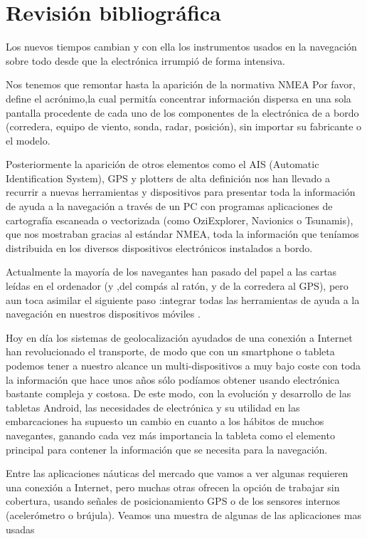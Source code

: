 \chapter{Revisión bibliográfica}
\label{revision}

Los nuevos tiempos cambian y con ella los instrumentos usados en la
navegación sobre todo desde que la electrónica irrumpió de forma
intensiva.

Nos tenemos que remontar hasta la aparición de la normativa NMEA
{\color{red} Por favor, define el acrónimo},la cual permitía
concentrar información dispersa en una sola pantalla procedente de
cada uno de los componentes de la electrónica de a bordo (corredera,
equipo de viento, sonda, radar, posición), sin importar su fabricante
o el modelo.

Posteriormente la aparición de otros elementos como el AIS (Automatic
Identification System), GPS y plotters de alta definición nos han
llevado a recurrir a nuevas herramientas y dispositivos para presentar
toda la información de ayuda a la navegación a través de un PC con
programas aplicaciones de cartografía escaneada o vectorizada (como
OziExplorer, Navionics o Tsunamis), que nos mostraban gracias al
estándar NMEA, toda la información que teníamos distribuida en los
diversos dispositivos electrónicos instalados a bordo.

Actualmente la mayoría de los navegantes han pasado del papel a las
cartas leídas en el ordenador (y ,del compás al ratón, y de la
corredera al GPS), pero aun toca asimilar el siguiente paso :integrar
todas las herramientas de ayuda a la navegación en nuestros
dispositivos móviles .

Hoy en día los sistemas de geolocalización ayudados de una conexión a
Internet han revolucionado el transporte, de modo que con un
smartphone o tableta podemos tener a nuestro alcance un
multi-dispositivos a muy bajo coste con toda la información que hace
unos años sólo podíamos obtener usando electrónica bastante compleja y
costosa. De este modo, con la evolución y desarrollo de las tabletas
Android, las necesidades de electrónica y su utilidad en las
embarcaciones ha supuesto un cambio en cuanto a los hábitos de muchos
navegantes, ganando cada vez más importancia la tableta como el
elemento principal para contener la información que se necesita para
la navegación.

Entre las aplicaciones náuticas del mercado que vamos a ver algunas
requieren una conexión a Internet, pero muchas otras ofrecen la opción
de trabajar sin cobertura, usando señales de posicionamiento GPS o de
los sensores internos (acelerómetro o brújula). Veamos una muestra de
algunas de las aplicaciones mas usadas
  
